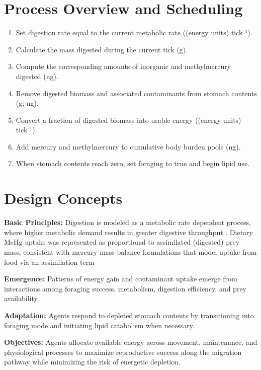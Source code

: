 \documentclass[
]{book}
\begin{document}
\section{Process Overview and Scheduling}\label{process-overview-and-scheduling-1}

\begin{enumerate}
\def\labelenumi{\arabic{enumi}.}
\item
  Set digestion rate equal to the current metabolic rate ((energy
  units) tick⁻¹).
\item
  Calculate the mass digested during the current tick (g).
\item
  Compute the corresponding amounts of inorganic and methylmercury
  digested (ng).
\item
  Remove digested biomass and associated contaminants from stomach
  contents (g; ng).
\item
  Convert a fraction of digested biomass into usable energy ((energy
  units) tick⁻¹).
\item
  Add mercury and methylmercury to cumulative body burden pools (ng).
\item
  When stomach contents reach zero, set foraging to true and begin
  lipid use.
\end{enumerate}

\section{Design Concepts}\label{design-concepts-1}

\textbf{Basic Principles:} Digestion is modeled as a metabolic rate dependent
process, where higher metabolic demand results in greater digestive
throughput \citep{brown_toward_2004}. Dietary MeHg uptake was represented as
proportional to assimilated (digested) prey mass, consistent with
mercury mass balance formulations that model uptake from food via an
assimilation term \citep{trudel_bioenergetics_2006}

\textbf{Emergence:} Patterns of energy gain and contaminant uptake emerge
from interactions among foraging success, metabolism, digestion
efficiency, and prey availability.

\textbf{Adaptation:} Agents respond to depleted stomach contents by
transitioning into foraging mode and initiating lipid catabolism when
necessary.

\textbf{Objectives:} Agents allocate available energy across movement,
maintenance, and physiological processes to maximize reproductive
success along the migration pathway while minimizing the risk of
energetic depletion.
\end{document}

